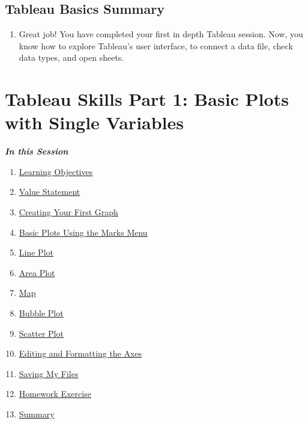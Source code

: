 \documentclass[
]{book}
\providecommand{\tightlist}{%
  \setlength{\itemsep}{0pt}\setlength{\parskip}{0pt}}
\begin{document}
\hypertarget{tableau-basics-summary}{%
\subsection{Tableau Basics Summary}\label{tableau-basics-summary}}

\begin{enumerate}
\def\labelenumi{\arabic{enumi}.}
\tightlist
\item
  Great job! You have completed your first in depth Tableau session. Now, you know how to explore Tableau's user interface, to connect a data file, check data types, and open sheets.
\end{enumerate}

\hypertarget{tableau-skills-part-1-basic-plots-with-single-variables}{%
\section{Tableau Skills Part 1: Basic Plots with Single Variables}\label{tableau-skills-part-1-basic-plots-with-single-variables}}

\textbf{\emph{In this Session}}

\begin{enumerate}
\def\labelenumi{\arabic{enumi}.}
\tightlist
\item
  \protect\hyperlink{basic-plots-learning-objectives}{Learning Objectives}
\item
  \protect\hyperlink{basic-plots-value-statement}{Value Statement}
\item
  \protect\hyperlink{creating-your-first-graph}{Creating Your First Graph}
\item
  \protect\hyperlink{basic-plots-using-the-marks-menu}{Basic Plots Using the Marks Menu}
\item
  \protect\hyperlink{line-plot}{Line Plot}
\item
  \protect\hyperlink{area-plot}{Area Plot}
\item
  \protect\hyperlink{map}{Map}
\item
  \protect\hyperlink{bubble-plot}{Bubble Plot}
\item
  \protect\hyperlink{scatter-plot}{Scatter Plot}
\item
  \protect\hyperlink{editing-and-formatting-the-axes}{Editing and Formatting the Axes}
\item
  \protect\hyperlink{saving-my-files}{Saving My Files}
\item
  \protect\hyperlink{homework-exercise}{Homework Exercise}
\item
  \protect\hyperlink{tableau-skills-part-1-summary}{Summary}
\end{enumerate}
\end{document}
